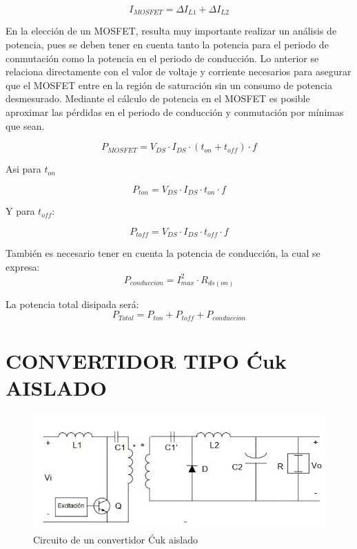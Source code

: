 \documentclass[conference]{IEEEtran}
\begin{document}
\begin{equation}
    I_{MOSFET}=\Delta I_{L1}+\Delta I_{L2}
\end{equation}

En la elección de un MOSFET, resulta muy importante realizar un análisis de potencia, pues se deben tener en cuenta tanto la potencia para el periodo de conmutación como la potencia en el periodo de conducción. Lo anterior se relaciona directamente con el valor de voltaje y corriente necesarios para asegurar que el MOSFET entre en la región de saturación sin un consumo de potencia desmesurado. Mediante el cálculo de potencia en el MOSFET es posible aproximar las pérdidas en el periodo de conducción y conmutación por mínimas que sean.

\begin{equation}
    P_{MOSFET}=V_{DS}\cdot I_{DS}\cdot (t_{on}+t_{off})\cdot f
\end{equation}

Asi para $t_{on}$

\begin{equation}
    P_{ton}=V_{DS}\cdot I_{DS}\cdot t_{on}\cdot f
\end{equation}

Y para $t_{off}$:

\begin{equation}
    P_{toff}=V_{DS}\cdot I_{DS}\cdot t_{off}\cdot f
\end{equation}

También es necesario tener en cuenta la potencia de conducción, la cual se expresa:
\begin{equation}
    P_{conduccion}=I_{max}^2\cdot R_{ds(on)}
\end{equation}

La potencia total disipada será:
\begin{equation}
    P_{Total}=P_{ton}+P_{toff}+P_{conduccion}
\end{equation}

\section{CONVERTIDOR TIPO Ćuk AISLADO}
\begin{figure}[h!]
    \centering
    \includegraphics[scale=0.55]{imagenes/aislado.jpg}
    \caption{Circuito de un convertidor Ćuk aislado}
    \label{fig: Ćuk aislado}
\end{figure}
\end{document}
